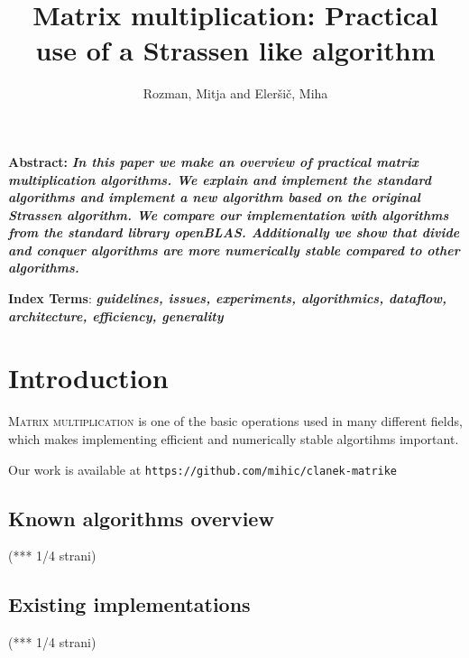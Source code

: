 \documentclass[a4paper,11pt]{article}
\title{Matrix multiplication: Practical use of a Strassen like algorithm}
\author{Rozman, Mitja and Eleršič, Miha}
\date{}
\renewenvironment{abstract}
{\begin{spacing}{1}\small\textbf{Abstract:}\bfseries\itshape}
{\end{spacing}}
\begin{document}
\maketitle



\begingroup
\renewcommand\thefootnote{}
\endgroup

\begin{abstract} %
In this paper we make an overview of practical matrix multiplication algorithms.
We explain and implement the standard algorithms and implement a new algorithm based on the original Strassen algorithm.
We compare our implementation with algorithms from the standard library openBLAS. Additionally we show that divide and conquer algorithms are more numerically stable compared to other algorithms.
\end{abstract}
\vspace{0.5cm}
\begin{spacing}{0.9}
\small\textbf{Index Terms}: \textbf{\textit{guidelines, issues, experiments, algorithmics, dataflow, architecture, efficiency, generality}}
\end{spacing}


\section{Introduction}

\lettrine{M}{atrix multiplication} 
is one of the basic operations used in many different fields, which makes implementing efficient and numerically stable algortihms important. 

Our work is available at \texttt{https://github.com/mihic/clanek-matrike}


\subsection{Known algorithms overview}
(*** 1/4 strani)
\subsection{Existing implementations}
(*** 1/4 strani)
\end{document}
